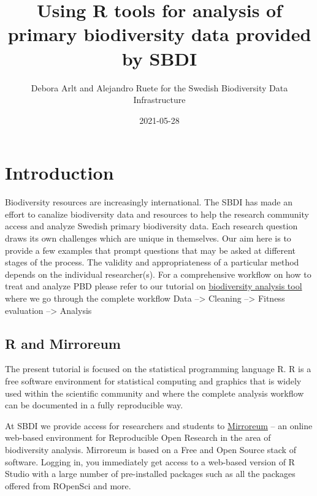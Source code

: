 \documentclass[
  10pt,
]{article}
\title{Using R tools for analysis of primary biodiversity data provided by SBDI}
\author{Debora Arlt and Alejandro Ruete for the Swedish Biodiversity Data Infrastructure}
\date{2021-05-28}
\begin{document}
\maketitle

{
\hypersetup{linkcolor=}
\setcounter{tocdepth}{2}
\tableofcontents
}
\hypertarget{introduction}{%
\section*{Introduction}\label{introduction}}

Biodiversity resources are increasingly international. The SBDI has made an effort to canalize biodiversity data and resources to help the research community access and analyze Swedish primary biodiversity data. Each research question draws its own challenges which are unique in themselves. Our aim here is to provide a few examples that prompt questions that may be asked at different stages of the process. The validity and appropriateness of a particular method depends on the individual researcher(s). For a comprehensive workflow on how to treat and analyze PBD please refer to our tutorial on \href{https://github.com/biodiversitydata-se/biodiversity-analysis-tools}{biodiversity analysis tool} where we go through the complete workflow Data --\textgreater{} Cleaning --\textgreater{} Fitness evaluation --\textgreater{} Analysis

\hypertarget{r-and-mirroreum}{%
\subsection*{R and Mirroreum}\label{r-and-mirroreum}}

The present tutorial is focused on the statistical programming language R.
R is a free software environment for statistical computing and graphics that is
widely used within the scientific community and where the complete analysis
workflow can be documented in a fully reproducible way.

At SBDI we provide access for researchers and students to \href{https://mirroreum.biodiversitydata.se/}{Mirroreum}
-- an online web-based environment for Reproducible Open Research in the area of
biodiversity analysis. Mirroreum is based on a Free and Open Source stack of software.
Logging in, you immediately get access to a web-based version of R Studio with a
large number of pre-installed packages such as all the packages offered from ROpenSci and more.
\end{document}
